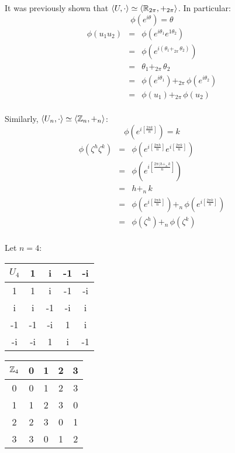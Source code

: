 \documentclass[letterpaper,12pt,fleqn]{article}
\newcommand{\bas}[2]{\left<#1,#2\right>}
\renewcommand{\o}{\theta}
\newcommand{\p}{\phi}
\newcommand{\z}{\zeta}
\begin{document}
\begin{example}
  It was previously shown that $\bas{U}{\cdot}\simeq\bas{\R_{2\pi}}{+_{2\pi}}$. In
  particular:
  \[\p\left(e^{i\o}\right)=\o\]
  \begin{eqnarray*}
    \p(u_1u_2) &=& \p\left(e^{i\o_1}e^{1\o_2}\right) \\
    &=& \p\left(e^{i(\o_1+_{2\pi}\,\o_2)}\right) \\
    &=& \o_1+_{2\pi}\,\o_2 \\
    &=& \p\left(e^{i\o_1}\right)+_{2\pi}\,\p\left(e^{i\o_2}\right) \\
    &=& \p(u_1)+_{2\pi}\,\p(u_2) \\
  \end{eqnarray*}

  Similarly, $\bas{U_n}{\cdot}\simeq\bas{\Z_n}{+_n}$:
  \[\p\left(e^{i\left[\frac{2\pi k}{n}\right]}\right)=k\]
  \begin{eqnarray*}
    \p(\z^h\z^k) &=&
    \p\left(e^{i\left[\frac{2\pi h}{n}\right]}e^{i\left[\frac{2\pi k}{n}\right]}\right) \\
    &=& \p\left(e^{i\left[\frac{2\pi(h+_n\,k}{n}\right]}\right) \\
    &=& h+_n\,k \\
    &=& \p\left(e^{i\left[\frac{2\pi h}{n}\right]}\right)+_n\,
        \p\left(e^{i\left[\frac{2\pi k}{n}\right]}\right) \\
    &=& \p(\z^h)+_n\,\p(\z^k) \\
  \end{eqnarray*}

  Let $n=4$:

  \bigskip

\begin{minipage}{2.5in}
  \begin{tabular}{c|cccc}
    $U_4$ & 1 & i & -1 & -i \\
    \hline
    1 & 1 & i & -1 & -i \\
    i & i & -1 & -i & i \\
    -1 & -1 & -i & 1 & i \\
    -i & -i & 1 & i & -1 \\
  \end{tabular}
  \end{minipage}
  \begin{minipage}{2.5in}
  \begin{tabular}{c|cccc}
    $\mathbb{Z}_4$ & 0 & 1 & 2 & 3 \\
    \hline
    0 & 0 & 1 & 2 & 3 \\
    1 & 1 & 2 & 3 & 0 \\
    2 & 2 & 3 & 0 & 1 \\
    3 & 3 & 0 & 1 & 2 \\
  \end{tabular}
\end{minipage}


\end{example}
\end{document}
